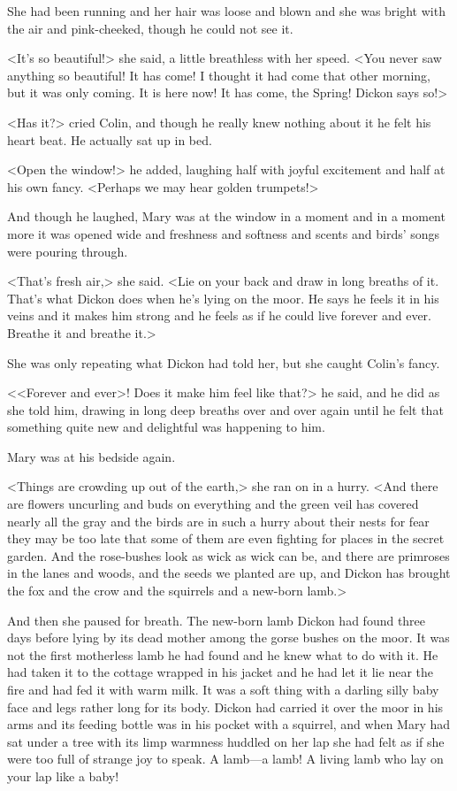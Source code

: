 She had been running and her hair was loose and blown and she was bright with the air and pink-cheeked, though he could not see it.

<It's so beautiful!> she said, a little breathless with her speed. <You never saw anything so beautiful! It has come! I thought it had come that other morning, but it was only coming. It is here now! It has come, the Spring! Dickon says so!>

<Has it?> cried Colin, and though he really knew nothing about it he felt his heart beat. He actually sat up in bed.

<Open the window!> he added, laughing half with joyful excitement and half at his own fancy. <Perhaps we may hear golden trumpets!>

And though he laughed, Mary was at the window in a moment and in a moment more it was opened wide and freshness and softness and scents and birds' songs were pouring through.

<That's fresh air,> she said. <Lie on your back and draw in long breaths of it. That's what Dickon does when he's lying on the moor. He says he feels it in his veins and it makes him strong and he feels as if he could live forever and ever. Breathe it and breathe it.>

She was only repeating what Dickon had told her, but she caught Colin's fancy.

<<Forever and ever>! Does it make him feel like that?> he said, and he did as she told him, drawing in long deep breaths over and over again until he felt that something quite new and delightful was happening to him.

Mary was at his bedside again.

<Things are crowding up out of the earth,> she ran on in a hurry. <And there are flowers uncurling and buds on everything and the green veil has covered nearly all the gray and the birds are in such a hurry about their nests for fear they may be too late that some of them are even fighting for places in the secret garden. And the rose-bushes look as wick as wick can be, and there are primroses in the lanes and woods, and the seeds we planted are up, and Dickon has brought the fox and the crow and the squirrels and a new-born lamb.>

And then she paused for breath. The new-born lamb Dickon had found three days before lying by its dead mother among the gorse bushes on the moor. It was not the first motherless lamb he had found and he knew what to do with it. He had taken it to the cottage wrapped in his jacket and he had let it lie near the fire and had fed it with warm milk. It was a soft thing with a darling silly baby face and legs rather long for its body. Dickon had carried it over the moor in his arms and its feeding bottle was in his pocket with a squirrel, and when Mary had sat under a tree with its limp warmness huddled on her lap she had felt as if she were too full of strange joy to speak. A lamb—a lamb! A living lamb who lay on your lap like a baby!

